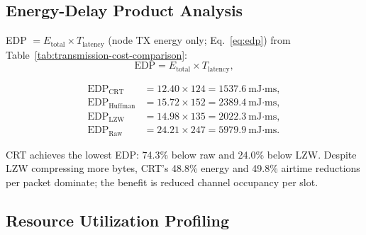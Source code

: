 \documentclass[pdflatex,sn-mathphys-num]{sn-jnl}
\theoremstyle{thmstyleone}
\theoremstyle{thmstyletwo}
\theoremstyle{thmstylethree}
\begin{document}
\subsection{Energy-Delay Product Analysis}
\label{subsec:edp_analysis}

EDP \cite{gonzalez2000energy} $= E_{\text{total}} \times T_{\text{latency}}$ (node TX energy only; Eq.~\ref{eq:edp}) from Table~\ref{tab:transmission-cost-comparison}:
\begin{equation}
\text{EDP} = E_{\text{total}} \times T_{\text{latency}},
\label{eq:edp}
\end{equation}

\begin{align*}
\text{EDP}_{\text{CRT}}      &= 12.40 \times 124 = 1537.6\ \text{mJ·ms}, \\
\text{EDP}_{\text{Huffman}}   &= 15.72 \times 152 = 2389.4\ \text{mJ·ms}, \\
\text{EDP}_{\text{LZW}}       &= 14.98 \times 135 = 2022.3\ \text{mJ·ms}, \\
\text{EDP}_{\text{Raw}}       &= 24.21 \times 247 = 5979.9\ \text{mJ·ms}.
\end{align*}

CRT achieves the lowest EDP: 74.3\% below raw and 24.0\% below LZW. Despite LZW compressing more bytes, CRT's 48.8\% energy and 49.8\% airtime reductions per packet dominate; the benefit is reduced channel occupancy per slot.

\subsection{Resource Utilization Profiling}
\label{subsec:resource_utilization}
\end{document}
